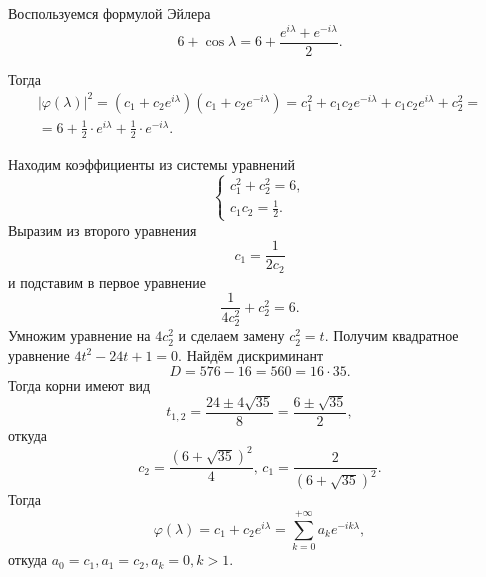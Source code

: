 Воспользуемся формулой Эйлера
\begin{equation*}
  6 + \cos \lambda =
  6 + \frac{e^{i \lambda } + e^{-i \lambda }}{2}.
\end{equation*}

Тогда
\begin{gather*}
  \left| \varphi \left( \lambda \right) \right|^2 =
  \left( c_1 + c_2 e^{i \lambda} \right) \left( c_1 + c_2 e^{-i \lambda } \right) =
  c_1^2 + c_1 c_2 e^{-i \lambda } + c_1 c_2 e^{i \lambda } + c_2^2 = \\
  = 6 + \frac{1}{2} \cdot e^{i \lambda } + \frac{1}{2} \cdot e^{-i \lambda }.
\end{gather*}

Находим коэффициенты из системы уравнений
\begin{equation*}
  \begin{cases}
    c_1^2 + c_2^2 = 6, \\
    c_1 c_2 = \frac{1}{2}.
  \end{cases}
\end{equation*}
Выразим из второго уравнения
\begin{equation*}
  c_1 =
  \frac{1}{2c_2}
\end{equation*}
и подставим в первое уравнение
\begin{equation*}
  \frac{1}{4c_2^2} + c_2^2 = 6.
\end{equation*}
Умножим уравнение на $4c_2^2$ и сделаем замену $c_2^2 = t$.
Получим квадратное уравнение $4t^2 - 24t + 1 = 0$.
Найдём дискриминант
\begin{equation*}
  D =
  576 - 16 = 560 = 16 \cdot 35.
\end{equation*}
Тогда корни имеют вид
\begin{equation*}
  t_{1, 2} =
  \frac{24 \pm 4 \sqrt{35}}{8} =
  \frac{6 \pm \sqrt{35}}{2},
\end{equation*}
откуда
\begin{equation*}
  c_2 = \frac{ \left( 6 + \sqrt{35} \right)^2}{4}, \,
  c_1 = \frac{2}{ \left( 6 + \sqrt{35} \right)^2}.
\end{equation*}
Тогда
\begin{equation*}
  \varphi \left( \lambda \right) =
  c_1 + c_2 e^{i \lambda } =
  \sum \limits_{k = 0}^{+\infty } a_k e^{-ik \lambda },
\end{equation*}
откуда $a_0 = c_1, a_1 = c_2, a_k = 0, k > 1$.
